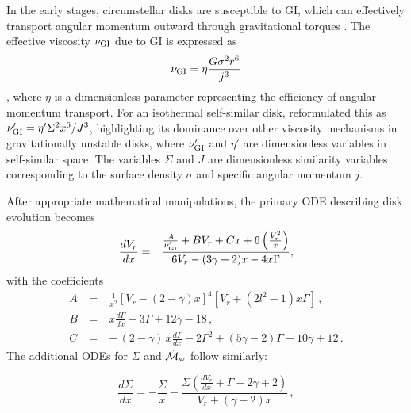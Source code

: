 \documentclass[twocolumn,linenumbers]{aastex631}
\begin{document}
In the early stages, circumstellar disks are susceptible to GI, which can effectively transport angular momentum outward through gravitational torques \citep{larson1984gravitational, nomura2000angular, gammie2001nonlinear}. The effective viscosity $\nu_{\rm GI}$ due to GI is expressed as
\begin{equation}
\nu_{\rm GI}=\eta \frac{G \sigma^2 r^6}{j^3}
\label{eq9}
\end{equation}
\citep{lin1987grav},
where $\eta$ is a dimensionless parameter representing the efficiency of angular momentum transport. For an isothermal self-similar disk, \citet{nomura2000angular} reformulated this as $\nu^{\prime}_{\rm GI}=\eta^{\prime}\Sigma^2 x^6/J^3$, highlighting its dominance over other viscosity mechanisms in gravitationally unstable disks, where $\nu'_{\rm GI}$ and $\eta'$ are dimensionless variables in self-similar space. The variables $\Sigma$ and $J$ are dimensionless similarity variables corresponding to the surface density $\sigma$ and specific angular momentum $j$.

After appropriate mathematical manipulations, the primary ODE describing disk evolution becomes
\begin{eqnarray}
\frac{dV_{r}}{dx} & = & \frac{\frac{A}{{\nu_{\rm GI}^{\prime}}} + BV_{r} + Cx + 6 \left (\frac{V^{2}_{r}}{x} \right)} {6V_{r}-(3\gamma+2)x-4x\Gamma},
\label{eq:mainalpha}
\end{eqnarray}
with the coefficients 
\begin{eqnarray}
A & ~=~ & \frac{1}{x^2} [V_{r}-(2-\gamma)x]^4[V_{r}+(2l^2-1)x\Gamma]\, , \\
B & ~=~ & x \frac{d\Gamma}{dx}-3\Gamma+12\gamma-18\, , \\ 
C & ~=~ & -\,(2-\gamma)\,x\frac{d \Gamma}{dx}-2\Gamma^2+(5\gamma -2)\Gamma-10\gamma+12\, .
\label{eq10}
\end{eqnarray}
The additional ODEs for $\Sigma$ and $\dot{\mathcal{M}}_{\rm w}$ follow similarly:




\begin{equation}
\frac{d\Sigma}{dx} = -\frac{\Sigma}{x} - \frac{\Sigma \left ( \frac{dV_r}{dx} +\Gamma - 2\gamma + 2  \right)}{V_r + (\gamma-2)x}
\label{eq:main_density}\, ,
\end{equation}




\end{document}
